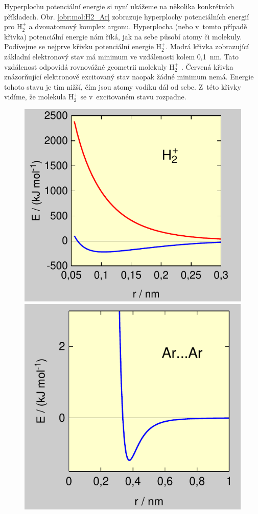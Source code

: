 Hyperplochu potenciální energie si nyní ukážeme na několika konkrétních příkladech. Obr. \ref{obr:mol:H2_Ar} zobrazuje hyperplochy potenciálních energií pro $\mathrm{H}_2^+$ a dvouatomový komplex argonu. Hyperplocha (nebo v~tomto případě křivka) potenciální energie nám říká, jak na sebe působí atomy či molekuly. Podívejme se nejprve křivku potenciální energie $\mathrm{H}_2^+$. Modrá křivka zobrazující základní elektronový stav má minimum ve vzdálenosti kolem 0,1~nm. Tato vzdálenost odpovídá rovnovážné geometrii molekuly $\mathrm{H}_2^+$ . Červená křivka znázorňující elektronově excitovaný stav naopak žádné minimum nemá. Energie tohoto stavu je tím nižší, čím jsou atomy vodíku dál od sebe. Z~této křivky vidíme, že molekula $\mathrm{H}_2^+$ se v~excitovaném stavu rozpadne.

\begin{figure} [ht]
\centering
\begin{center}\includegraphics[scale=0.8]{obrazky/h2+.pdf}\hspace*{-1pt}\includegraphics[scale=0.8]{obrazky/arar.pdf}\end{center}

\end{figure}
